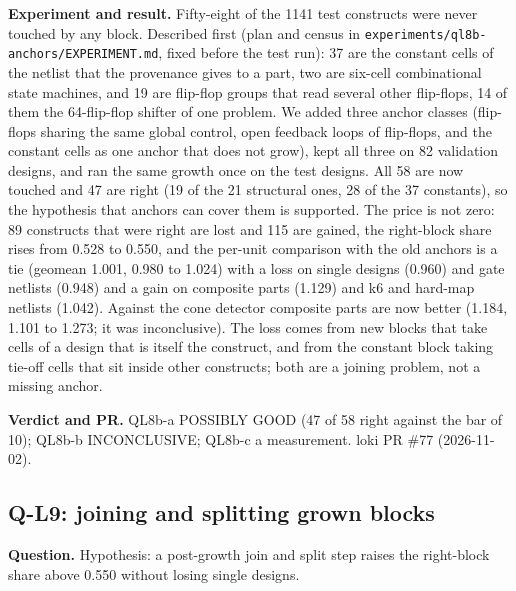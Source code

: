 \documentclass[conference]{IEEEtran}
\newcommand{\hev}[1]{\par\smallskip\noindent\textbf{#1}}
\newcommand{\code}[1]{\texttt{#1}}
\begin{document}
\hev{Experiment and result.} Fifty-eight of the 1141 test constructs were never touched by any block. Described first (plan and census in \code{experiments/ql8b-anchors/EXPERIMENT.md}, fixed before the test run): 37 are the
constant cells of the netlist that the provenance gives to a part, two are six-cell combinational state machines, and 19 are flip-flop groups that read several other flip-flops, 14 of them the
64-flip-flop shifter of one problem. We added three anchor classes (flip-flops sharing the same global control, open feedback loops of flip-flops, and the constant cells as one anchor that does not grow),
kept all three on 82 validation designs, and ran the same growth once on the test designs. All 58 are now touched and 47 are right (19 of the 21 structural ones, 28 of the 37 constants), so the
hypothesis that anchors can cover them is supported. The price is not zero: 89 constructs that were right are lost and 115 are gained, the right-block share rises from 0.528 to 0.550, and the per-unit
comparison with the old anchors is a tie (geomean 1.001, 0.980 to 1.024) with a loss on single designs (0.960) and gate netlists (0.948) and a gain on composite parts (1.129) and k6 and hard-map netlists (1.042). Against the cone detector
composite parts are now better (1.184, 1.101 to 1.273; it was inconclusive). The loss comes from new blocks that take cells of a design that is itself the construct, and from the constant block taking tie-off
cells that sit inside other constructs; both are a joining problem, not a missing anchor.

\hev{Verdict and PR.} QL8b-a POSSIBLY GOOD (47 of 58 right against the bar of 10); QL8b-b INCONCLUSIVE; QL8b-c a measurement. loki PR \#77 (2026-11-02).

\subsection{Q-L9: joining and splitting grown blocks}
\label{rec:ql9}

\hev{Question.} Hypothesis: a post-growth join and split step raises the right-block share above 0.550 without losing single designs.
\end{document}
